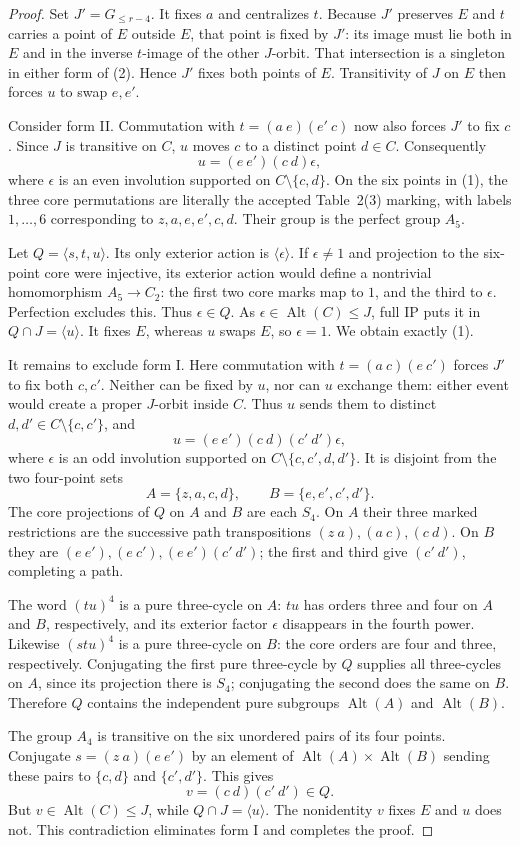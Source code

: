 \documentclass[11pt,a4paper]{article}
\newcommand{\gen}[1]{\langle#1\rangle}
\newcommand{\Alt}{\operatorname{Alt}}
\begin{document}
\begin{proof}
Set $J'=G_{\le r-4}$. It fixes $a$ and centralizes $t$.
Because $J'$ preserves $E$ and $t$ carries a point of
$E$ outside $E$, that point is fixed by $J'$: its image
must lie both in $E$ and in the inverse $t$-image of
the other $J$-orbit. That intersection is a singleton
in either form of (2). Hence $J'$ fixes both points of
$E$. Transitivity of $J$ on $E$ then forces $u$ to swap
$e,e'$.

Consider form II. Commutation with $t=(a\ e)(e'\ c)$
now also forces $J'$ to fix $c$. Since $J$ is transitive
on $C$, $u$ moves $c$ to a distinct point $d\in C$.
Consequently
\[
                     u=(e\ e')(c\ d)\epsilon,
\]
where $\epsilon$ is an even involution supported on
$C\setminus\{c,d\}$. On the six points in (1), the
three core permutations are literally the accepted
Table~2(3) marking, with labels $1,\ldots,6$ corresponding
to $z,a,e,e',c,d$. Their group is the perfect group $A_5$.

Let $Q=\gen{s,t,u}$. Its only exterior action is
$\gen\epsilon$. If $\epsilon\ne1$ and projection to
the six-point core were injective, its exterior action
would define a nontrivial homomorphism $A_5\to C_2$:
the first two core marks map to $1$, and the third to
$\epsilon$. Perfection excludes this. Thus
$\epsilon\in Q$. As $\epsilon\in\Alt(C)\le J$, full IP
puts it in $Q\cap J=\gen u$. It fixes $E$, whereas $u$
swaps $E$, so $\epsilon=1$. We obtain exactly (1).

It remains to exclude form I. Here commutation with
$t=(a\ c)(e\ c')$ forces $J'$ to fix both $c,c'$.
Neither can be fixed by $u$, nor can $u$ exchange them:
either event would create a proper $J$-orbit inside $C$.
Thus $u$ sends them to distinct $d,d'\in C\setminus\{c,c'\}$,
and
\[
                    u=(e\ e')(c\ d)(c'\ d')\epsilon,
\]
where $\epsilon$ is an odd involution supported on
$C\setminus\{c,c',d,d'\}$. It is disjoint from the two
four-point sets
\[
                 A=\{z,a,c,d\},\qquad B=\{e,e',c',d'\}.
\]
The core projections of $Q$ on $A$ and $B$ are each
$S_4$. On $A$ their three marked restrictions are the
successive path transpositions $(z\ a),(a\ c),(c\ d)$.
On $B$ they are $(e\ e'),(e\ c'),(e\ e')(c'\ d')$;
the first and third give $(c'\ d')$, completing a path.

The word $(tu)^4$ is a pure three-cycle on $A$:
$tu$ has orders three and four on $A$ and $B$, respectively,
and its exterior factor $\epsilon$ disappears in the fourth
power. Likewise $(stu)^4$ is a pure three-cycle on $B$:
the core orders are four and three, respectively.
Conjugating the first pure three-cycle by $Q$ supplies
all three-cycles on $A$, since its projection there is
$S_4$; conjugating the second does the same on $B$.
Therefore $Q$ contains the independent pure subgroups
$\Alt(A)$ and $\Alt(B)$.

The group $A_4$ is transitive on the six unordered pairs
of its four points. Conjugate $s=(z\ a)(e\ e')$ by an
element of $\Alt(A)\times\Alt(B)$ sending these pairs
to $\{c,d\}$ and $\{c',d'\}$. This gives
\[
                     v=(c\ d)(c'\ d')\in Q.
\]
But $v\in\Alt(C)\le J$, while $Q\cap J=\gen u$.
The nonidentity $v$ fixes $E$ and $u$ does not. This
contradiction eliminates form I and completes the proof.
\end{proof}
\end{document}
